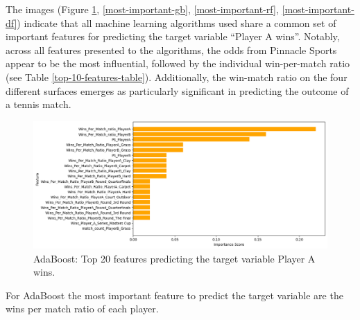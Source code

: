 \documentclass[preprint,aps,nofootinbib,a4paper,superscriptaddress,longbibliography,amsfonts,amssymb,amsmath,titlepage]{revtex4-2}
\begin{document}
The images (Figure \ref{most-important-ada}, \ref{most-important-gb}, \ref{most-important-rf}, \ref{most-important-df}) indicate that all machine learning algorithms used share a common set of important features for predicting the target variable ``Player A wins''. Notably, across all features presented to the algorithms, the odds from Pinnacle Sports appear to be the most influential, followed by the individual win-per-match ratio (see Table \ref{top-10-features-table}). Additionally, the win-match ratio on the four different surfaces emerges as particularly significant in predicting the outcome of a tennis match.

%
\begin{figure}[h]
\includegraphics[width=\textwidth]{pictures/most-important-ada.png}
\caption{AdaBoost: Top 20 features predicting the target variable Player A wins.}
\label{most-important-ada}
\end{figure}
%
For AdaBoost the most important feature to predict the target variable are the wins per match ratio of each player.
\end{document}
